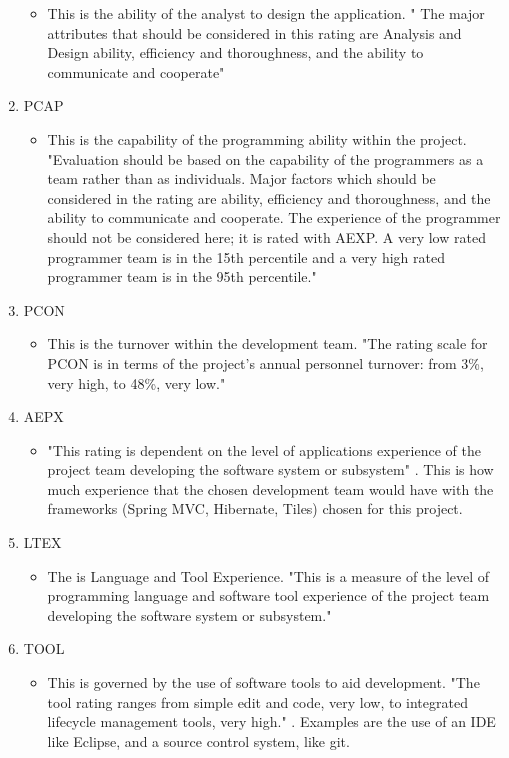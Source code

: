 \begin{enumerate}
\begin{itemize}
\item This is the ability of the analyst to design the application. " The major attributes that should be considered in this rating are Analysis and Design ability, efficiency and thoroughness, and the ability to communicate and cooperate" \parencite{coco}
\end{itemize}
\item PCAP
\begin{itemize}
\item This is the capability of the programming ability within the project. "Evaluation should be based on the capability of the programmers as a team rather than as individuals. Major factors which should be considered in the rating are ability, efficiency and thoroughness, and the ability to communicate and cooperate. The experience of the programmer should not be considered here; it is rated with AEXP. A very low rated programmer team is in the 15th percentile and a very high rated programmer team is in the 95th percentile." \parencite{coco} 
\end{itemize}
\item PCON
\begin{itemize}
\item This is the turnover within the development team. "The rating scale for PCON is in terms of the project's annual personnel turnover: from 3\%, very high, to 48\%, very low." \parencite{coco}
\end{itemize}
\item AEPX
\begin{itemize}
\item "This rating is dependent on the level of applications experience of the project team developing the software system or subsystem" \parencite{coco}. This is how much experience that the chosen development team would have with the frameworks (Spring MVC, Hibernate, Tiles) chosen for this project.
\end{itemize}
\item LTEX
\begin{itemize}
\item The is Language and Tool Experience. "This is a measure of the level of programming language and software tool experience of the project team developing the software system or subsystem." \parencite{coco}
\end{itemize}
\item TOOL
\begin{itemize}
\item This is governed by the use of software tools to aid development. "The tool rating ranges from simple edit and code, very low, to integrated lifecycle management tools, very high." \parencite{coco}. Examples are the use of an IDE like Eclipse, and a source control system, like git.

\end{itemize}
\end{enumerate}
